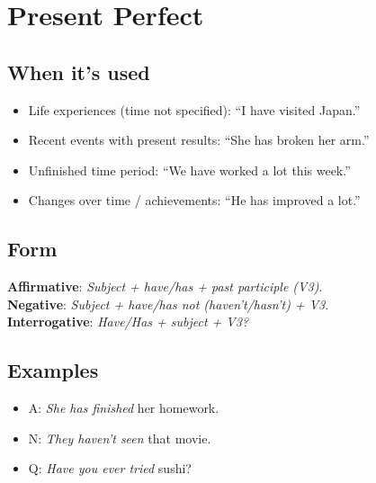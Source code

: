 \documentclass[11pt,a4paper]{article}
\begin{document}
\section{Present Perfect}
\subsection*{When it’s used}
\begin{itemize}
  \item Life experiences (time not specified): ``I have visited Japan.''
  \item Recent events with present results: ``She has broken her arm.''
  \item Unfinished time period: ``We have worked a lot this week.''
  \item Changes over time / achievements: ``He has improved a lot.''
\end{itemize}

\subsection*{Form}
\textbf{Affirmative}: \emph{Subject + have/has + past participle (V3)}.\\
\textbf{Negative}: \emph{Subject + have/has not (haven’t/hasn’t) + V3}.\\
\textbf{Interrogative}: \emph{Have/Has + subject + V3?}

\subsection*{Examples}
\begin{itemize}
  \item A: \emph{She has finished} her homework.
  \item N: \emph{They haven’t seen} that movie.
  \item Q: \emph{Have you ever tried} sushi?
\end{itemize}
\end{document}
